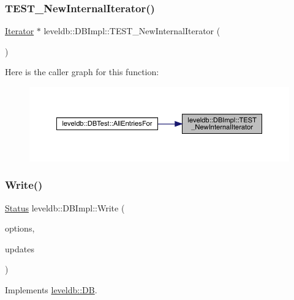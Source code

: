 \subsubsection{\texorpdfstring{TEST\_NewInternalIterator()}{TEST\_NewInternalIterator()}}
{\footnotesize\ttfamily \mbox{\hyperlink{classleveldb_1_1_iterator}{Iterator}} $\ast$ leveldb\+::\+D\+B\+Impl\+::\+T\+E\+S\+T\+\_\+\+New\+Internal\+Iterator (\begin{DoxyParamCaption}{ }\end{DoxyParamCaption})}

Here is the caller graph for this function\+:
\nopagebreak
\begin{figure}[H]
\begin{center}
\leavevmode
\includegraphics[width=350pt]{classleveldb_1_1_d_b_impl_adba5bf4252bd94f7db50e62921b7ba53_icgraph}
\end{center}
\end{figure}
\mbox{\label{classleveldb_1_1_d_b_impl_ac0d0b472717099d6a02ad9dace4e8ef4}} 
\subsubsection{\texorpdfstring{Write()}{Write()}}
{\footnotesize\ttfamily \mbox{\hyperlink{classleveldb_1_1_status}{Status}} leveldb\+::\+D\+B\+Impl\+::\+Write (\begin{DoxyParamCaption}\item[{const \mbox{\hyperlink{structleveldb_1_1_write_options}{Write\+Options}} \&}]{options,  }\item[{\mbox{\hyperlink{classleveldb_1_1_write_batch}{Write\+Batch}} $\ast$}]{updates }\end{DoxyParamCaption})\hspace{0.3cm}{\ttfamily [virtual]}}



Implements \mbox{\hyperlink{classleveldb_1_1_d_b_ae0b6ded8c8e0b88ff70190bf7a0c086c}{leveldb\+::\+DB}}.

